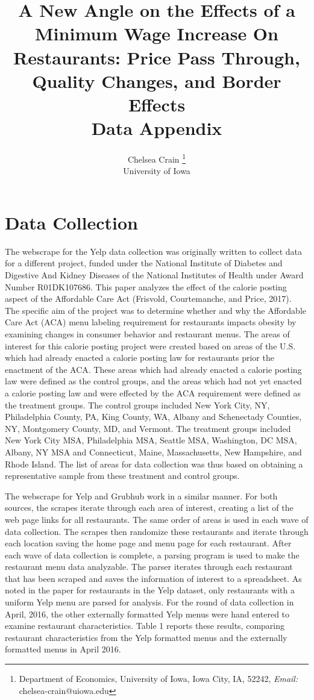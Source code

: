 \documentclass[11pt]{article}
\title{A New Angle on the Effects of a  Minimum Wage Increase On Restaurants:  Price Pass Through, Quality Changes, and Border Effects \\
Data Appendix}
\author{Chelsea Crain \footnote{Department of Economics, University of Iowa, Iowa City, IA, 52242, \textit{Email: }chelsea-crain@uiowa.edu }  \\ University of Iowa}
\begin{document}
\maketitle

\section{Data Collection}

The webscrape for the Yelp data collection was originally written to collect data for a different project, funded under the National Institute of Diabetes and Digestive And Kidney Diseases of the National Institutes of Health under Award Number R01DK107686. This paper analyzes the effect of the calorie posting aspect of the Affordable Care Act (Frisvold, Courtemanche, and Price, 2017). The specific aim of the project was to determine whether and why the Affordable Care Act (ACA) menu labeling requirement for restaurants impacts obesity by examining changes in consumer behavior and restaurant menus. The areas of interest for this calorie posting project were created based on areas of the U.S. which had already enacted a calorie posting law for restaurants prior the enactment of the ACA. These areas which had already enacted a calorie posting law were defined as the control groups, and the areas which had not yet enacted a calorie posting law and were effected by the ACA requirement were defined as the treatment groups. The control groups included New York City, NY, Philadelphia County, PA, King County, WA, Albany and Schenectady Counties, NY, Montgomery County, MD, and Vermont. The treatment groups included New York City MSA, Philadelphia MSA, Seattle MSA, Washington, DC MSA, Albany, NY MSA and Connecticut, Maine, Massachusetts, New Hampshire, and Rhode Island. The list of areas for data collection was thus based on obtaining a representative sample from these treatment and control groups. 

The webscrape for Yelp and Grubhub work in a similar manner. For both sources, the scrapes iterate through each area of interest, creating a list of the web page links for all restaurants. The same order of areas is used in each wave of data collection. The scrapes then randomize these restaurants and iterate through each location saving the home page and menu page for each restaurant. After each wave of data collection is complete, a parsing program is used to make the restaurant menu data analyzable. The parser iterates through each restaurant that has been scraped and saves the information of interest to a spreadsheet. As noted in the paper for restaurants in the Yelp dataset, only restaurants with a uniform Yelp menu are parsed for analysis. For the round of data collection in April, 2016, the other externally formatted Yelp menus were hand entered to examine restaurant characteristics. Table 1 reports these results, comparing restaurant characteristics from the Yelp formatted menus and the externally formatted menus in April 2016. 
\end{document}
